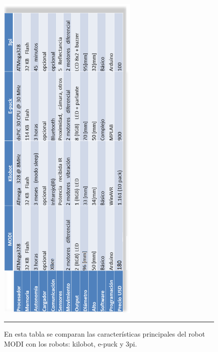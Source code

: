 \begin{figure}[htbp]
	\centering
		\includegraphics[width=0.6\textwidth]{./Figures/tabla_robots_modi.png}
		\rule{35em}{0.5pt}
	\caption[Tabla comparativa robots MODI]{En esta tabla se comparan las características principales del robot MODI con los robots: kilobot, e-puck y 3pi.}
	\label{fig:Tabla robots MODI}
\end{figure}
